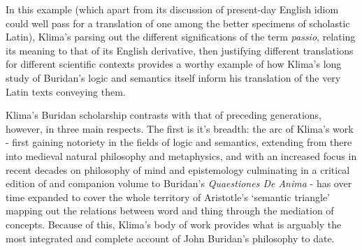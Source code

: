 \documentclass[]{article}
\begin{document}
In this example
(which apart from its discussion of present-day English idiom could well pass for a translation of one among the better specimens of scholastic Latin), 
Klima's parsing out the different significations of the term \emph{passio}, 
relating its meaning to that of its English derivative, 
then justifying different translations for different scientific contexts 
provides a worthy example of how Klima's long study of Buridan's logic and semantics itself inform his translation of the very Latin texts conveying them.

Klima's Buridan scholarship contrasts with that of preceding generations, 
however, 
in three main respects. 
The first is it's breadth: 
the arc of Klima's work - 
first gaining notoriety in the fields of logic and semantics, 
extending from there into medieval natural philosophy and metaphysics, 
and with an increased focus in recent decades on philosophy of mind and epistemology 
culminating in a critical edition of and companion volume to Buridan's \emph{Quaestiones De Anima}  -  
has over time expanded to cover the whole territory of Aristotle's `semantic triangle'  
mapping out the relations between word and thing through the mediation of concepts. 
Because of this, Klima's body of work provides what is arguably the most integrated and complete account of John Buridan's philosophy to date.
\end{document}

